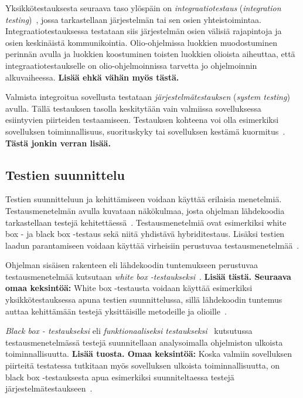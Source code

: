 \documentclass[finnish, grading]{tktltiki2}
\theoremstyle{definition}
\theoremstyle{remark}
\begin{document}
Yksikkötestauksesta seuraava taso ylöspäin on \textit{integraatiotestaus} (\textit{integration testing})~\cite[s. 45]{Binder:1999}, jossa tarkastellaan järjestelmän tai sen osien yhteistoimintaa. Integraatiotestauksessa testataan siis järjestelmän osien välisiä rajapintoja ja osien keskinäistä kommunikointia. Olio-ohjelmissa luokkien muodostuminen perinnän avulla ja luokkien koostuminen toisten luokkien olioista aiheuttaa, että integraatiotestaukselle on olio-ohjelmoinnissa tarvetta jo ohjelmoinnin alkuvaiheessa. \textbf{Lisää ehkä vähän myös tästä.}

Valmista integroitua sovellusta testataan \textit{järjestelmätestauksen} (\textit{system testing})~\cite[s. 45]{Binder:1999} avulla. Tällä testauksen tasolla keskitytään vain valmiissa sovelluksessa esiintyvien piirteiden testaamiseen. Testauksen kohteena voi olla esimerkiksi sovelluksen toiminnallisuus, suorituskyky tai sovelluksen kestämä kuormitus~\cite[s. 45]{Binder:1999}. \textbf{Tästä jonkin verran lisää.}


\subsection{Testien suunnittelu}

Testien suunnitteluun ja kehittämiseen voidaan käyttää erilaisia menetelmiä. Testausmenetelmän avulla kuvataan näkökulmaa, josta ohjelman lähdekoodia tarkastellaan testejä kehitettäessä~\cite[s. 51]{Binder:1999}. Testausmenetelmiä ovat esimerkiksi white box - ja black box -testaus sekä niitä yhdistävä hybriditestaus. Lisäksi testien laadun parantamiseen voidaan käyttää virheisiin perustuvaa testausmenetelmää~\cite{Joku mutaatiolähde tähän.}.

Ohjelman sisäisen rakenteen eli lähdekoodin tuntemukseen perustuvaa testausmenetelmää kutsutaan \textit{white box -testaukseksi}~\cite[s. 52]{Binder:1999}. \textbf{Lisää tästä. Seuraava omaa keksintöä:} White box -testausta voidaan käyttää esimerkiksi yksikkötestauksessa apuna testien suunnittelussa, sillä lähdekoodin tuntemus auttaa kehittämään testejä yksittäisille metodeille ja olioille~\cite{JOKU??}.

\textit{Black box - testaukseksi} eli \textit{funktionaaliseksi testaukseksi}~\cite[s. 52]{Binder:1999} kutsutussa testausmenetelmässä testejä suunnitellaan analysoimalla ohjelmiston ulkoista toiminnallisuutta. \textbf{Lisää tuosta. Omaa keksintöä:} Koska valmiin sovelluksen piirteitä testatessa tutkitaan myös sovelluksen ulkoista toiminnallisuutta, on black box -testauksesta apua esimerkiksi suunniteltaessa testejä järjestelmätestaukseen~\cite{Mistä lie?}.
\end{document}
